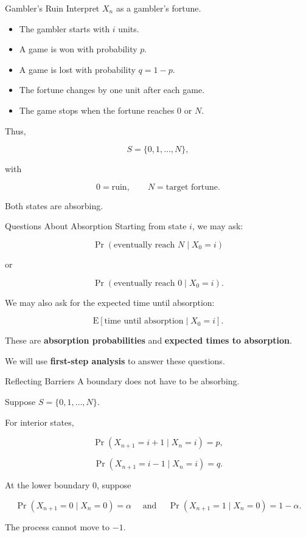 \documentclass[
  ignorenonframetext,
  aspectratio=169,
]{beamer}
\providecommand{\tightlist}{%
  \setlength{\itemsep}{0pt}\setlength{\parskip}{0pt}}
\begin{document}
\begin{frame}{Gambler's Ruin}
\protect{}\label{gamblers-ruin}
Interpret \(X_n\) as a gambler's fortune.

\begin{itemize}
\tightlist
\item
  The gambler starts with \(i\) units.
\item
  A game is won with probability \(p\).
\item
  A game is lost with probability \(q=1-p\).
\item
  The fortune changes by one unit after each game.
\item
  The game stops when the fortune reaches \(0\) or \(N\).
\end{itemize}

Thus,

\[
S=\{0,1,\ldots,N\},
\]

with

\[
0=\text{ruin},
\qquad
N=\text{target fortune}.
\]

Both states are absorbing.
\end{frame}

\begin{frame}{Questions About Absorption}
\protect{}\label{questions-about-absorption}
Starting from state \(i\), we may ask:

\[
\Pr(\text{eventually reach }N\mid X_0=i)
\]

or

\[
\Pr(\text{eventually reach }0\mid X_0=i).
\]

We may also ask for the expected time until absorption:

\[
\mathrm{E}[\text{time until absorption}\mid X_0=i].
\]

These are \textbf{absorption probabilities} and \textbf{expected times
to absorption}.

We will use \textbf{first-step analysis} to answer these questions.
\end{frame}

\begin{frame}{Reflecting Barriers}
\protect{}\label{reflecting-barriers}
A boundary does not have to be absorbing.

Suppose \(S=\{0,1,\ldots,N\}.\)

For interior states,

\[
\Pr(X_{n+1}=i+1\mid X_n=i)=p,
\]

\[
\Pr(X_{n+1}=i-1\mid X_n=i)=q.
\]

At the lower boundary \(0\), suppose

\[
\Pr(X_{n+1}=0\mid X_n=0)=\alpha \quad \text{ and } \quad \Pr(X_{n+1}=1\mid X_n=0)=1-\alpha.
\]

The process cannot move to \(-1\).
\end{frame}
\end{document}
